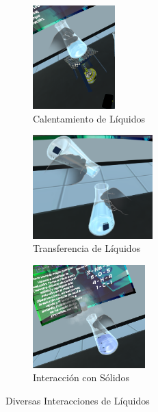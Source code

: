 \begin{figure}[thbp]
    \centering
    \begin{subfigure}[b]{0.3\linewidth}
        \includegraphics[width=\linewidth, height = 4cm]{img/chapter05/Calentamiento.png}
        \caption{Calentamiento de Líquidos}
        \label{fig:Calentamiento}
    \end{subfigure}
    \begin{subfigure}[b]{0.3\linewidth}
        \includegraphics[width=\linewidth, height = 4cm]{img/chapter05/Vertido.png}
        \caption{Transferencia de Líquidos}
        \label{fig:Vertido}
    \end{subfigure}
    \begin{subfigure}[b]{0.3\linewidth}
        \includegraphics[width=\linewidth, height = 4cm]{img/chapter05/Agregar_Solidos.png}
        \caption{Interacción con Sólidos}
        \label{fig:Sólidos}
    \end{subfigure}
    \caption{Diversas Interacciones de Líquidos}
\end{figure}
